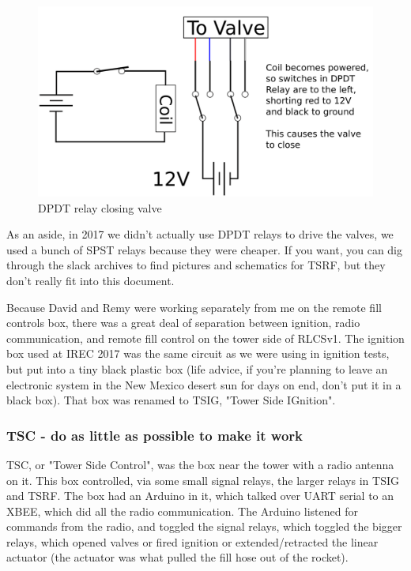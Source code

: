 \documentclass[11pt]{article}
\begin{document}
\begin{figure}[htbp]
\centering
\includegraphics[width=.9\linewidth]{./images/dpdt_closing.png}
\caption{\label{fig:orgfd883ba}
DPDT relay closing valve}
\end{figure}

As an aside, in 2017 we didn't actually use DPDT relays to drive the valves, we
used a bunch of SPST relays because they were cheaper. If you want, you can dig
through the slack archives to find pictures and schematics for TSRF, but they
don't really fit into this document.

Because David and Remy were working separately from me on the remote fill
controls box, there was a great deal of separation between ignition, radio
communication, and remote fill control on the tower side of RLCSv1. The ignition
box used at IREC 2017 was the same circuit as we were using in ignition tests,
but put into a tiny black plastic box (life advice, if you're planning to leave
an electronic system in the New Mexico desert sun for days on end, don't put it
in a black box). That box was renamed to TSIG, "Tower Side IGnition".

\subsubsection{TSC - do as little as possible to make it work}
\label{sec:org8aecf9f}

TSC, or "Tower Side Control", was the box near the tower with a radio antenna on
it. This box controlled, via some small signal relays, the larger relays in TSIG
and TSRF. The box had an Arduino in it, which talked over UART serial to an
XBEE, which did all the radio communication. The Arduino listened for commands
from the radio, and toggled the signal relays, which toggled the bigger relays,
which opened valves or fired ignition or extended/retracted the linear actuator
(the actuator was what pulled the fill hose out of the rocket).
\end{document}
